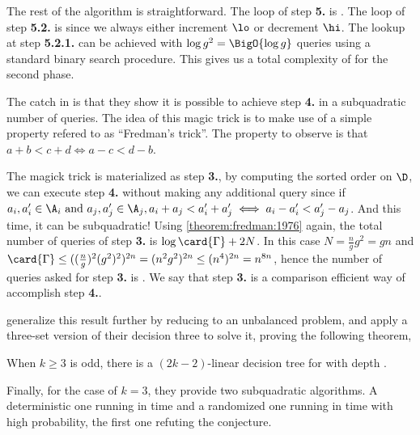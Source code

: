 The rest of the algorithm is straightforward. The loop of step \textbf{5.} is
. The loop of step \textbf{5.2.} is  since we
always either increment $\lo$ or decrement $\hi$. The lookup at step
\textbf{5.2.1.} can be achieved with $\log g^2 = \BigO{\log g}$ queries using
a standard binary search procedure. This gives us a total complexity of
 for the second phase.

The catch in \cite{gronlund:2014} is that they show it is possible to
achieve step \textbf{4.} in a subquadratic number of queries. The idea of this
magic trick is to make use of a simple property refered to as ``Fredman's
trick''. The property to observe is that $a + b < c + d \iff a - c < d - b$.

The magick trick is materialized as step \textbf{3.}, by computing the sorted
order on $\D$, we can execute step \textbf{4.} without making any additional
query since if $a_i, a_i' \in \A_i \text{ and } a_j, a_j' \in \A_j, a_i + a_j <
a_i' + a_j' \iff a_i - a_i' < a_j' - a_j$. And this time, it can be
subquadratic! Using \ref{theorem:fredman:1976} again, the total number of
queries of step \textbf{3.} is $\log \card{\Gamma} + 2N$. In this case $N =
\frac{n}{g} g^2 = gn$ and $\card{\Gamma} \le ((\frac{n}{g})^2 (g^2)^2)^{2n} =
(n^2 g^2)^{2n} \le (n^4)^{2n} = n^{8n}$, hence the number of queries asked for
step \textbf{3.} is . We say that step \textbf{3.} is a
comparison efficient way of accomplish step \textbf{4.}.

\citet*{gronlund:2014} generalize this result further by reducing \kLDT to
an unbalanced \threeSUM problem, and apply a three-set version of their
decision three to solve it, proving the following theorem,

\begin{theorem}
When $k \ge 3$ is odd, there is a $(2k-2)$-linear decision tree for \kLDT with
depth .
\end{theorem}

Finally, for the case of $k = 3$, they provide two subquadratic \threeSUM
algorithms. A deterministic one running in  time and a randomized one running in  time with high probability, the first one refuting the \threeSUM
conjecture.
